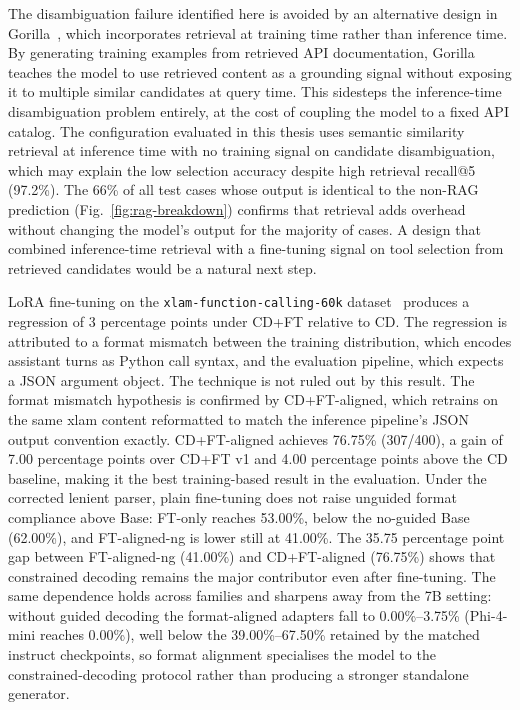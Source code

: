 The disambiguation failure identified here is avoided by an alternative
design in Gorilla~\cite{patil2023gorilla}, which incorporates retrieval at
training time rather than inference time. By generating training examples from
retrieved API documentation, Gorilla teaches the model to use retrieved
content as a grounding signal without exposing it to multiple similar
candidates at query time. This sidesteps the inference-time disambiguation
problem entirely, at the cost of coupling the model to a fixed API catalog.
The configuration evaluated in this thesis uses semantic similarity retrieval
at inference time with no training signal on candidate disambiguation, which
may explain the low selection accuracy despite high retrieval recall@5
(97.2\%). The 66\% of all test cases whose output is identical to the non-RAG
prediction (Fig.~\ref{fig:rag-breakdown}) confirms that retrieval adds
overhead without changing the model's output for the majority of cases. A design that combined
inference-time retrieval with a fine-tuning signal on tool selection from
retrieved candidates would be a natural next step.

LoRA fine-tuning on the \texttt{xlam-function-calling-60k}
dataset~\cite{zhang2024xlam, hu2022lora} produces a regression of 3
percentage points under CD+FT relative to CD. The regression
is attributed to a format mismatch between the training distribution, which
encodes assistant turns as Python call syntax, and the evaluation pipeline,
which expects a JSON argument object. The technique is not ruled out by this
result. The format mismatch hypothesis is confirmed by CD+FT-aligned,
which retrains on the same xlam content reformatted to match the inference
pipeline's JSON output convention exactly. CD+FT-aligned achieves
76.75\% (307/400), a gain of 7.00 percentage points over CD+FT v1 and
4.00 percentage points above the CD baseline, making it the best
training-based result in the evaluation. Under the corrected lenient parser,
plain fine-tuning does not raise unguided
format compliance above Base: FT-only reaches 53.00\%, below the no-guided
Base (62.00\%), and FT-aligned-ng is lower still at 41.00\%. The 35.75
percentage point gap between FT-aligned-ng (41.00\%) and CD+FT-aligned
(76.75\%) shows that constrained decoding remains the major contributor even
after fine-tuning. The same dependence holds across families and sharpens
away from the 7B setting: without guided decoding the format-aligned adapters
fall to 0.00\%--3.75\% (Phi-4-mini reaches 0.00\%), well below the 39.00\%--67.50\%
retained by the matched instruct checkpoints, so format alignment specialises
the model to the constrained-decoding protocol rather than producing a
stronger standalone generator.

